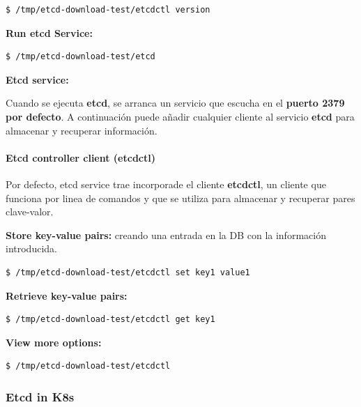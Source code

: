 \documentclass{article}
\newenvironment{codetemplate}[1][]{%
  \mybasecolorbox[#1]
  \itshape
}{%
  \endmybasecolorbox
}
\begin{document}
\begin{codetemplate}{}
\begin{verbatim}
$ /tmp/etcd-download-test/etcdctl version
\end{verbatim}
\end{codetemplate}

\textbf{Run etcd Service:}
\begin{codetemplate}{}
\begin{verbatim}
$ /tmp/etcd-download-test/etcd
\end{verbatim}
\end{codetemplate}

\textbf{Etcd service:}

Cuando se ejecuta \textbf{etcd}, se arranca un servicio que escucha en el \textbf{puerto 2379 por defecto}. A continuación puede añadir cualquier cliente al servicio \textbf{etcd} para almacenar y recuperar información.

\paragraph{Etcd controller client (etcdctl)}

Por defecto, etcd service trae incorporade el cliente \textbf{etcdctl}, un cliente que funciona por linea de comandos y que se utiliza para almacenar y recuperar pares clave-valor.

\textbf{Store key-value pairs:} creando una entrada en la DB con la información introducida.
\begin{codetemplate}{}
\begin{verbatim}
$ /tmp/etcd-download-test/etcdctl set key1 value1
\end{verbatim}
\end{codetemplate}

\textbf{Retrieve key-value pairs:}
\begin{codetemplate}{}
\begin{verbatim}
$ /tmp/etcd-download-test/etcdctl get key1
\end{verbatim}
\end{codetemplate}

\textbf{View more options:}
\begin{codetemplate}{}
\begin{verbatim}
$ /tmp/etcd-download-test/etcdctl
\end{verbatim}
\end{codetemplate}

\subsubsection{Etcd in K8s}
\end{document}
